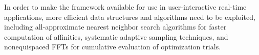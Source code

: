 \documentclass[article]{gmp2014}
\theoremstyle{definition}
\begin{document}
In order to make the framework available for use in user-interactive real-time applications, more efficient data structures and algorithms need to be exploited, including all-approximate nearest neighbor search algorithms for faster computation of affinities, systematic adaptive sampling techniques, and nonequispaced FFTs for cumulative evaluation of optimization trials.



\protect\footnotesize 
\end{document}
